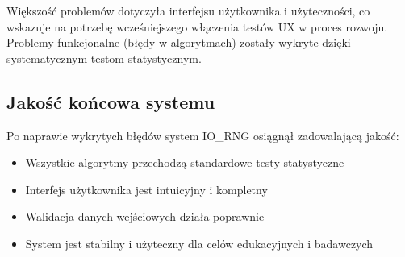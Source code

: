 \documentclass[12pt,a4paper]{article}
\begin{document}
Większość problemów dotyczyła interfejsu użytkownika i użyteczności, co wskazuje na potrzebę wcześniejszego włączenia testów UX w proces rozwoju. Problemy funkcjonalne (błędy w algorytmach) zostały wykryte dzięki systematycznym testom statystycznym.

\subsection{Jakość końcowa systemu}

Po naprawie wykrytych błędów system IO\_RNG osiągnął zadowalającą jakość:
\begin{itemize}
    \item Wszystkie algorytmy przechodzą standardowe testy statystyczne
    \item Interfejs użytkownika jest intuicyjny i kompletny
    \item Walidacja danych wejściowych działa poprawnie
    \item System jest stabilny i użyteczny dla celów edukacyjnych i badawczych
\end{itemize}
\end{document}
